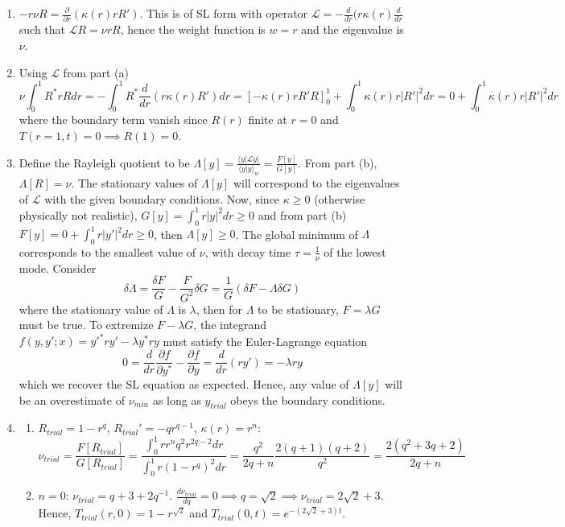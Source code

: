 \documentclass[a4paper]{article}
\begin{document}
\begin{ans}\leavevmode
\begin{enumerate}[label=(\alph*)]
\item $-r\nu R=\frac{\partial}{\partial r}(\kappa(r)rR')$. This is of SL form with operator $\mathcal{L}=-\frac{d}{dr}(r\kappa(r)\frac{d}{dr}$ such that $\mathcal{L}R=\nu rR$, hence the weight function is $w=r$ and the eigenvalue is $\nu$.
\item Using $\mathcal{L}$ from part (a) 
$$\nu\int_0^1R^*r Rdr=-\int_0^1R^*\frac{d}{dr}(r\kappa(r) R')dr=[-\kappa (r)rR'R]_0^1+\int_0^1\kappa(r)r|R'|^2dr=0+\int_0^1\kappa(r)r|R'|^2dr$$
where the boundary term vanish since $R(r)$ finite at $r=0$ and $T(r=1,t)=0\implies R(1)=0$.
\item Define the Rayleigh quotient to be $\Lambda[y]=\frac{\langle y|\mathcal{L}y\rangle}{\langle y|y\rangle_w}=\frac{F[y]}{G[y]}$. From part (b), $\Lambda[R]=\nu$. The stationary values of $\Lambda[y]$ will correspond to the eigenvalues of $\mathcal{L}$ with the given boundary conditions. Now, since $\kappa\geq 0$ (otherwise physically not realistic), $G[y]=\int_0^1r|y|^2dr\geq0$ and from part (b) $F[y]=0+\int_0^1r|y'|^2dr\geq0$, then $\Lambda[y]\geq0$. The global minimum of $\Lambda$ corresponds to the smallest value of $\nu$, with decay time $\tau=\frac{1}{\nu}$ of the lowest mode. Consider
$$\delta\Lambda=\frac{\delta F}{G}-\frac{F}{G^2}\delta G=\frac{1}{G}(\delta F-\Lambda\delta G)$$
where the stationary value of $\Lambda$ is $\lambda$, then for $\Lambda$ to be stationary, $F=\lambda G$ must be true. To extremize $F-\lambda G$, the integrand $f(y,y';x)=y'^*ry'-\lambda y^*ry$ must satisfy the Euler-Lagrange equation
$$0=\frac{d}{dr}\frac{\partial f}{\partial y^*}-\frac{\partial f}{\partial y}=\frac{d}{dr}(ry')=-\lambda ry$$
which we recover the SL equation as expected. Hence, any value of $\Lambda[y]$ will be an overestimate of $\nu_{min}$ as long as $y_{trial}$ obeys the boundary conditions.
\item
\begin{enumerate}[label=(\roman*)]
\item $R_{trial}=1-r^q$, $R_{trial}'=-qr^{q-1}$, $\kappa(r)=r^n$:
$$\nu_{trial}=\frac{F[R_{trial}]}{G[R_{trial}]}=\frac{\int_0^1rr^nq^2r^{2q-2}dr}{\int_0^1r(1-r^q)^2dr}=\frac{q^2}{2q+n}\frac{2(q+1)(q+2)}{q^2}=\frac{2(q^2+3q+2)}{2q+n}$$
\item $n=0$: $\nu_{trial}=q+3+2q^{-1}$. $\frac{d\nu_{trial}}{dq}=0\implies q=\sqrt{2}\implies\nu_{trial}=2\sqrt{2}+3$. Hence, $T_{trial}(r,0)=1-r^{\sqrt{2}}$ and $T_{trial}(0,t)=e^{-(2\sqrt{2}+3)t}$.
\end{enumerate}
\end{enumerate}
\end{ans}
\newpage
\end{document}
